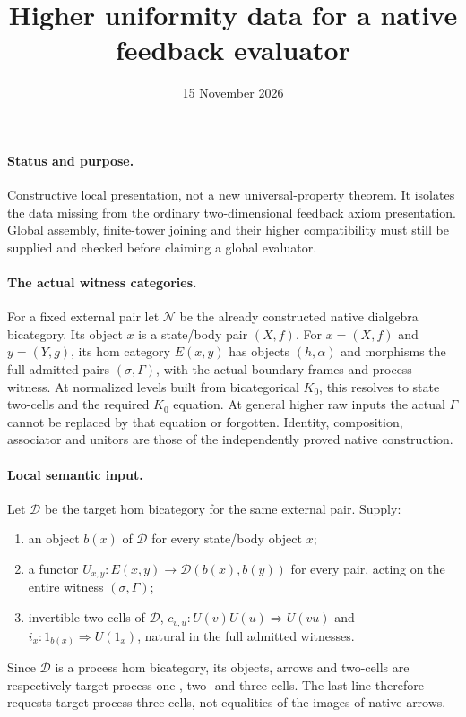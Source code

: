 \documentclass{article}
\title{Higher uniformity data for a native feedback evaluator}
\date{15 November 2026}
\begin{document}
\maketitle
\paragraph{Status and purpose.} Constructive local presentation, not a new universal-property theorem. It isolates the data missing from the ordinary two-dimensional feedback axiom presentation. Global assembly, finite-tower joining and their higher compatibility must still be supplied and checked before claiming a global evaluator.

\paragraph{The actual witness categories.} For a fixed external pair let $\mathcal N$ be the already constructed native dialgebra bicategory. Its object $x$ is a state/body pair $(X,f)$. For $x=(X,f)$ and $y=(Y,g)$, its hom category $E(x,y)$ has objects $(h,\alpha)$ and morphisms the full admitted pairs $(\sigma,\Gamma)$, with the actual boundary frames and process witness. At normalized levels built from bicategorical $K_0$, this resolves to state two-cells and the required $K_0$ equation. At general higher raw inputs the actual $\Gamma$ cannot be replaced by that equation or forgotten. Identity, composition, associator and unitors are those of the independently proved native construction.

\paragraph{Local semantic input.} Let $\mathcal D$ be the target hom bicategory for the same external pair. Supply:
\begin{enumerate}
\item an object $b(x)$ of $\mathcal D$ for every state/body object $x$;
\item a functor $U_{x,y}:E(x,y)\to\mathcal D(b(x),b(y))$ for every pair, acting on the entire witness $(\sigma,\Gamma)$;
\item invertible two-cells of $\mathcal D$,
$c_{v,u}:U(v)U(u)\Rightarrow U(vu)$ and $i_x:1_{b(x)}\Rightarrow U(1_x)$, natural in the full admitted witnesses.
\end{enumerate}
Since $\mathcal D$ is a process hom bicategory, its objects, arrows and two-cells are respectively target process one-, two- and three-cells. The last line therefore requests target process three-cells, not equalities of the images of native arrows.
\end{document}
